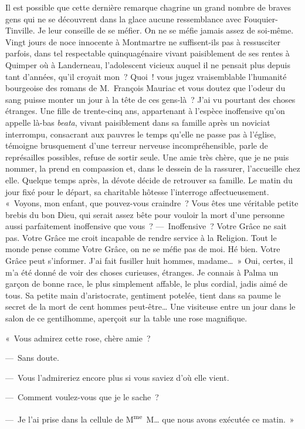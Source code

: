 \documentclass[french,twoside]{book} %
\newcommand{\astertri}{\medskip\par\centerline{\color{rubric}\large\selectfont{\syms ✻\,✻\,✻}}\medskip\par}%
\begin{document}
\astertri

\noindent Il est possible que cette dernière remarque chagrine un grand nombre de braves gens qui ne se découvrent dans la glace aucune ressemblance avec Fouquier-Tinville. Je leur conseille de se méfier. On ne se méfie jamais assez de soi-même. Vingt jours de noce innocente à Montmartre ne suffisent-ils pas à ressusciter parfois, dans tel respectable quinquagénaire vivant paisiblement de ses rentes à Quimper où à Landerneau, l’adolescent vicieux auquel il ne pensait plus depuis tant d’années, qu’il croyait mon ? Quoi ! vous jugez vraisemblable l’humanité bourgeoise des romans de M. François Mauriac et vous doutez que l’odeur du sang puisse monter un jour à la tête de ces gens-là ? J’ai vu pourtant des choses étranges. Une fille de trente-cinq ans, appartenant à l’espèce inoffensive qu’on appelle là-bas \emph{beata}, vivant paisiblement dans sa famille après un noviciat interrompu, consacrant aux pauvres le temps qu’elle ne passe pas à l’église, témoigne brusquement d’une terreur nerveuse incompréhensible, parle de représailles possibles, refuse de sortir seule. Une amie très chère, que je ne puis nommer, la prend en compassion et, dans le dessein de la rassurer, l’accueille chez elle. Quelque temps après, la dévote décide de retrouver sa famille. Le matin du jour fixé pour le départ, sa charitable hôtesse l’interroge affectueusement. « Voyons, mon enfant, que pouvez-vous craindre ? Vous êtes une véritable petite brebis du bon Dieu, qui serait assez bête pour vouloir la mort d’une personne aussi parfaitement inoffensive que vous ? — Inoffensive ? Votre Grâce ne sait pas. Votre Grâce me croit incapable de rendre service à la Religion. Tout le monde pense comme Votre Grâce, on ne se méfie pas de moi. Hé bien. Votre Grâce peut s’informer. J’ai fait fusiller huit hommes, madame… » Oui, certes, il m’a été donné de voir des choses curieuses, étranges. Je connais à Palma un garçon de bonne race, le plus simplement affable, le plus cordial, jadis aimé de tous. Sa petite main d’aristocrate, gentiment potelée, tient dans sa paume le secret de la mort de cent hommes peut-être… Une visiteuse entre un jour dans le salon de ce gentilhomme, aperçoit sur la table une rose magnifique.\par
« Vous admirez cette rose, chère amie ?\par
— Sans doute.\par
— Vous l’admireriez encore plus si vous saviez d’où elle vient.\par
— Comment voulez-vous que je le sache ?\par
— Je l’ai prise dans la cellule de M\textsuperscript{me} M… que nous avons exécutée ce matin. »\par
 \par
\end{document}

